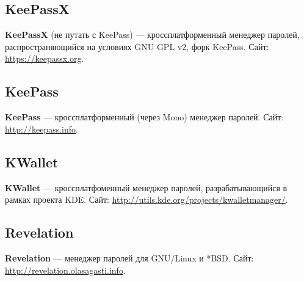 \subsection{KeePassX}
\textbf{KeePassX} (не путать с KeePass) --- кроссплатформенный менеджер паролей, распространяющийся на условиях GNU GPL v2, форк KeePass. Сайт: \url{https://keepassx.org}.
\subsection{KeePass}
\textbf{KeePass} --- кроссплатформенный (через Mono) менеджер паролей. Сайт: \url{http://keepass.info}.
\subsection{KWallet}
\textbf{KWallet} --- кроссплатфоменный менеджер паролей, разрабатывающийся в рамках проекта KDE. Сайт: \url{http://utils.kde.org/projects/kwalletmanager/}.
\subsection{Revelation}
\textbf{Revelation} --- менеджер паролей для GNU/Linux и *BSD. Сайт: \url{http://revelation.olasagasti.info}.
